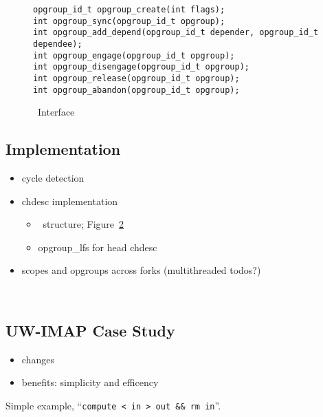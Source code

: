 \begin{figure}[htb]
\begin{small}
\texttt{opgroup\_id\_t opgroup\_create(int flags);}\\
\texttt{int opgroup\_sync(opgroup\_id\_t opgroup);}\\
\texttt{int opgroup\_add\_depend(opgroup\_id\_t depender, opgroup\_id\_t dependee);}\\
\texttt{int opgroup\_engage(opgroup\_id\_t opgroup);}\\
\texttt{int opgroup\_disengage(opgroup\_id\_t opgroup);}\\
\texttt{int opgroup\_release(opgroup\_id\_t opgroup);}\\
\texttt{int opgroup\_abandon(opgroup\_id\_t opgroup);}
\end{small}
\caption{\label{fig:opgroup-interface} \Opgroup\ Interface}
\end{figure}

\subsection{Implementation}
\label{sec:opgroup:implementation}
\begin{itemize}
\item cycle detection
\item chdesc implementation
  \begin{itemize}
  \item \chdesc\ structure; Figure~\ref{fig:opgroup-chdescs}
  \item opgroup\_lfs for head chdesc
  \end{itemize}
\item scopes and opgroups across forks (multithreaded todos?)
\end{itemize}

\begin{figure}[htb]
\caption{\label{fig:opgroup-chdescs} \Opgroup\ \Chdescs}
\end{figure}
\subsection{UW-IMAP Case Study}
\label{sec:opgroup:uwimap}
\begin{itemize}
\item changes
\item benefits: simplicity and efficency
\end{itemize}

Simple example, ``\texttt{compute < in > out \&\& rm in}''.
